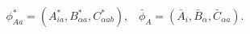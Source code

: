 \begin{equation*}
\phi _{Aa}^{\ast }=(A_{ia}^{\ast },B_{\alpha a}^{\ast },C_{\alpha ab}^{\ast
}),\;\;\;\bar{\phi}_{A}=(\bar{A}_{i},\bar{B}_{\alpha },\bar{C}_{\alpha a}).
\end{equation*}

